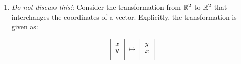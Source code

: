 \documentclass[10pt]{amsart}
\begin{document}
\begin{enumerate}
  {\em Answer}: Option (E)

  {\em Explanation}: For a vector $\left[\begin{matrix} x \\ y
      \\\end{matrix}\right]$, we can write:

  $$\left[\begin{matrix} x \\ y \\\end{matrix}\right] = x \left[\begin{matrix} 1 \\ 0 \\\end{matrix}\right] + y\left[\begin{matrix} 0 \\ 1 \\\end{matrix}\right]$$

  Thus, we have expressed our arbitrary vector of $\R^2$ as a linear
  combination of the vectors $\left[\begin{matrix} 1 \\ 0
      \\\end{matrix}\right]$ and $\left[\begin{matrix} 0 \\ 1
      \\\end{matrix}\right]$. In the notation given, $\lambda = x$ and
  $\mu = y$.

  Note the key point that the $\lambda$ and $\mu$ values can vary
  arbitrarily. They are not restricted to be nonnegative (Option (D))
  and they are not required to have at least one of them zero, or to
  be equal to each other (Options (A)-(C)).

  {\em Performance review}: 24 out of 30 people got this. 3 chose (C),
  2 chose (D), 1 chose (A).
\item {\em Do not discuss this!}: Consider the transformation from
  $\R^2$ to $\R^2$ that interchanges the coordinates of a
  vector. Explicitly, the transformation is given as:

  $$\left[\begin{matrix} x \\ y \\\end{matrix}\right] \mapsto \left[\begin{matrix} y \\ x \\\end{matrix}\right]$$


\end{enumerate}
\end{document}
